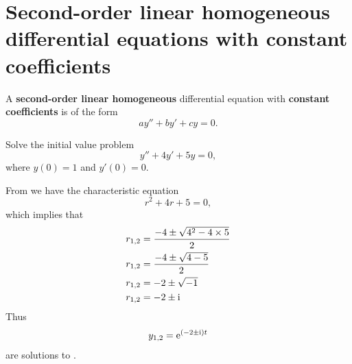 \section{Second-order linear homogeneous differential equations with constant coefficients}
A \textbf{second-order linear homogeneous} differential equation with 
\textbf{constant coefficients} is of the form
\begin{equation}
    a y'' + by' + cy = 0.
\end{equation}
\begin{ex}
    Solve the initial value problem
    \begin{equation}
        y'' + 4y' +5y = 0,
        \label{eq:2013-nov-ivp}
    \end{equation}
    where $y(0) = 1$ and $y'(0) = 0$.
    \begin{sol}
        From  we have the characteristic equation
        \begin{equation}
            r^2 +4r +5 = 0,
            \label{eq:2013-nov-ivp-char}
        \end{equation}
        which implies that
        \begin{align*}
            r_{1,2} &= \frac{
                -4 \pm \sqrt{4^2 - 4 \times 5}
            }{
                2
            } \\
            r_{1,2} &= \frac {
                -4 \pm \sqrt{4-5}
            }{
                2
            }\\
            r_{1,2} &= -2 \pm \sqrt{-1} \\
            r_{1,2} &= -2 \pm \mathrm i
        \end{align*} 
        Thus
        \[ y_{1,2} = \mathrm e ^ {(-2 \pm \mathrm i ) t} \]
        are solutions to .
    \end{sol}
\end{ex}
